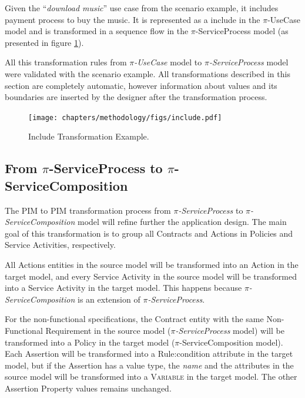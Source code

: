 \begin{exampl}
Given the ``\textit{download music}'' use case from the scenario example, it
includes payment process to buy the music. It is represented as a include in the $\pi$-UseCase model and is
transformed in a sequence flow in the $\pi$-ServiceProcess model (as presented
in figure \ref{fig:include}).
\end{exampl}
  

All this transformation rules from \textit{$\pi$-UseCase} model to
\textit{$\pi$-ServiceProcess} model were validated with the scenario example.
All transformations described in this section are completely automatic, however
information about values and its boundaries are inserted by the designer after
the transformation process.


\begin{figure}[ht!]
\centering
\texttt{[image: chapters/methodology/figs/include.pdf]}
\caption{Include Transformation Example.}
\label{fig:include}
\end{figure}

\subsection{From $\pi$-ServiceProcess to
$\pi$-ServiceComposition}

The PIM to PIM transformation process from \textit{$\pi$-ServiceProcess} to
\textit{$\pi$-ServiceComposition} model will refine further the application
design. The main goal of this transformation is to group all {\sc Contracts} and
{\sc Actions} in {\sc Policies} and {\sc Service Activities}, respectively. 


All {\sc Actions} entities in the source model will be transformed into an {\sc
Action} in the target model, and every {\sc Service Activity} in the source
model will be transformed into a {\sc Service Activity} in the target model.
This happens because \textit{$\pi$-ServiceComposition} is an extension of
\textit{$\pi$-ServiceProcess}.


For the non-functional specifications, the {\sc Contract} entity with the same
{\sc Non-Functional Requirement} in the source model
(\textit{$\pi$-ServiceProcess} model) will be transformed into a {\sc Policy} in
the target model ($\pi$-ServiceComposition model).  Each {\sc Assertion} will be
transformed into a {\sc Rule:condition} attribute in the target model, but if
the {\sc Assertion} has a value type, the \textit{name}
and the attributes in the source model will be transformed into a
\textsc{Variable} in the target model. The other {\sc Assertion
Property} values remains unchanged.



